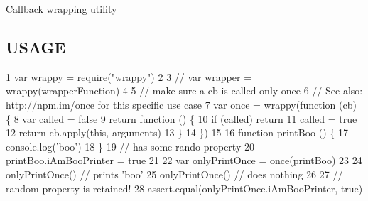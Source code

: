Callback wrapping utility

\subsection*{U\+S\+A\+G\+E}


\begin{DoxyCode}
1 var wrappy = require("wrappy")
2 
3 // var wrapper = wrappy(wrapperFunction)
4 
5 // make sure a cb is called only once
6 // See also: http://npm.im/once for this specific use case
7 var once = wrappy(function (cb) \{
8   var called = false
9   return function () \{
10     if (called) return
11     called = true
12     return cb.apply(this, arguments)
13   \}
14 \})
15 
16 function printBoo () \{
17   console.log('boo')
18 \}
19 // has some rando property
20 printBoo.iAmBooPrinter = true
21 
22 var onlyPrintOnce = once(printBoo)
23 
24 onlyPrintOnce() // prints 'boo'
25 onlyPrintOnce() // does nothing
26 
27 // random property is retained!
28 assert.equal(onlyPrintOnce.iAmBooPrinter, true)
\end{DoxyCode}
 